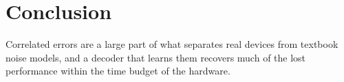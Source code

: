 \chapter{Conclusion}
\label{ch:conclusion}

Correlated errors are a large part of what separates real devices from textbook noise models, and
a decoder that learns them recovers much of the lost performance within the time budget of the
hardware.
